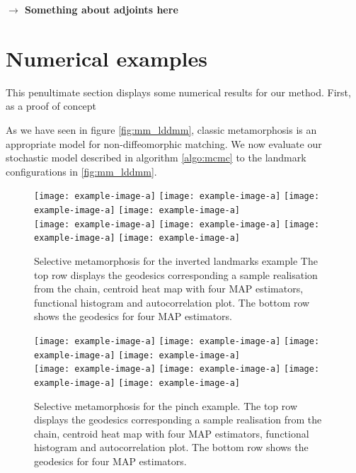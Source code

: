 \documentclass[runningheads]{llncs}
\begin{document}
\textbf{$\longrightarrow$ Something about adjoints here}\\

\section{Numerical examples}\label{sec:numerical}

This penultimate section displays some numerical results for our method. First,
as a proof of concept 

As we have seen in figure \ref{fig:mm_lddmm}, classic metamorphosis is an
appropriate model for non-diffeomorphic matching. We now evaluate our stochastic
model described in algorithm \ref{algo:mcmc} to the landmark configurations in
\ref{fig:mm_lddmm}.

\begin{figure}
\centering
\begin{minipage}{\textwidth}
  \centering
    \texttt{[image: example-image-a]}\quad
    \texttt{[image: example-image-a]}\quad
    \texttt{[image: example-image-a]}\quad
    \texttt{[image: example-image-a]}\\[0.25cm]
    \texttt{[image: example-image-a]}\quad
    \texttt{[image: example-image-a]}\quad
    \texttt{[image: example-image-a]}\quad
    \texttt{[image: example-image-a]}
    \caption{Selective metamorphosis for the inverted landmarks example The top
    row displays the geodesics corresponding a sample realisation from the
    chain, centroid heat map with four MAP estimators, functional histogram and
    autocorrelation plot. The bottom row shows the geodesics for four MAP
    estimators.}
    \label{fig:selective:crisscross}
\end{minipage}
\end{figure}
\begin{figure}
\centering
\begin{minipage}{\textwidth}
  \centering
    \texttt{[image: example-image-a]}\quad
    \texttt{[image: example-image-a]}\quad
    \texttt{[image: example-image-a]}\quad
    \texttt{[image: example-image-a]}\\[0.25cm]
    \texttt{[image: example-image-a]}\quad
    \texttt{[image: example-image-a]}\quad
    \texttt{[image: example-image-a]}\quad
    \texttt{[image: example-image-a]}
    \caption{Selective metamorphosis for the pinch example. The top row displays
    the geodesics corresponding a sample realisation from the chain, centroid
    heat map with four MAP estimators, functional histogram and autocorrelation
    plot. The bottom row shows the geodesics for four MAP estimators.}
    \label{fig:selective:pinch}
\end{minipage}
\end{figure}
\end{document}
